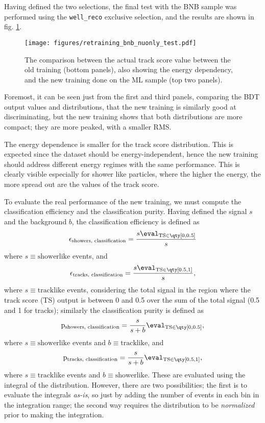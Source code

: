 Having defined the two selections, the final test with the BNB sample was performed using the \texttt{well\_reco} exclusive selection, and the results are shown in fig. \ref{fig:retraining_bnb_nuonly_test}. 
 
\begin{figure}[!h]
    \centering
    \texttt{[image: figures/retraining\_bnb\_nuonly\_test.pdf]}
    \caption{The comparison between the actual track score value between the old training (bottom panels), also showing the energy dependency, and the new training done on the ML sample (top two panels).}
    \label{fig:retraining_bnb_nuonly_test}
\end{figure}

Foremost, it can be seen just from the first and third panels, comparing the BDT output values and distributions, that the new training is similarly good at discriminating, but the new training shows that both distributions are more compact; they are more peaked, with a smaller RMS. 

The energy dependence is smaller for the track score distribution. This is expected since the dataset should be energy-independent, hence the new training should address different energy regimes with the same performance. This is clearly visible especially for shower like particles, where the higher the energy, the more spread out are the values of the track score. 

To evaluate the real performance of the new training, we must compute the classification efficiency and the classification purity. Having defined the signal $s$ and the background $b$, the classification efficiency is defined as \[
    \epsilon_\text{showers, classification} = \frac{s\eval_{\text{TS}\in\qty[0, 0.5]}}{s} 
\] where $s \equiv \text{showerlike}$ events, and \[
    \epsilon_\text{tracks, classification} = \frac{s\eval_{\text{TS}\in\qty[0.5, 1]}}{s},
\] where $s \equiv \text{tracklike}$ events, considering the total signal in the region where the track score (TS) output is between 0 and 0.5 over the sum of the total signal (0.5 and 1 for tracks); similarly the classification purity is defined as \[
    \mathrm p_\text{showers, classification} = \frac{s}{s+b} \eval_{\text{TS}\in\qty[0, 0.5]}, 
\] where $s \equiv \text{showerlike}$ events and $b \equiv \text{tracklike}$, and \[
    \mathrm p_\text{tracks, classification} = \frac{s}{s+b}\eval_{\text{TS}\in\qty[0.5, 1]},
\] where $s \equiv \text{tracklike}$ events and $b \equiv \text{showerlike}$. These are evaluated using the integral of the distribution. However, there are two possibilities; the first is to evaluate the integrals \emph{as-is}, so just by adding the number of events in each bin in the integration range; the second way requires the distribution to be \emph{normalized} prior to making the integration. 


